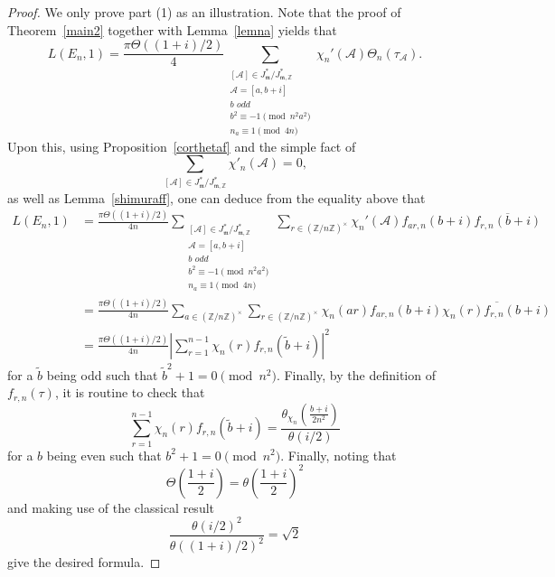 \documentclass[10pt,a4paper]{amsart}
\begin{document}
\begin{proof}
    
We only prove part (1) as an illustration.  Note that the proof of Theorem~\ref{main2} together with Lemma~\ref{lemna} yields that
     $$
   L(E_{n},1)=\frac{\pi\Theta((1+i)/2)}{4}\sum_{\substack{[\mathcal{A}]\in J_{\mathfrak{m}}^{*}/J_{\mathfrak{m},\mathbb{Z}}^{*}\\ \mathcal{A}=[a,b+i]\\b\,\,odd\\b^{2}\equiv-1\pmod{n^{2}a^{2}}\\n_{a}\equiv1\pmod{4n}}}\chi_{n}'(\mathcal{A})\Theta_{n}(\tau_{\mathcal{A}}).
    $$
Upon this,    using Proposition~\ref{corthetaf} and the simple fact of
$$
\sum_{[\mathcal{A}]\in J_{\mathfrak{m}}^{*}/J_{\mathfrak{m},\mathbb{Z}}^{*}}\chi'_{n}(\mathcal{A})=0,
$$
as well as Lemma~\ref{shimuraff},  one can deduce from the equality above that
   \begin{align*}
        L(E_{n},1)&=\frac{\pi\Theta((1+i)/2)}{4n}\sum_{\substack{[\mathcal{A}]\in J_{\mathfrak{m}}^{*}/J_{\mathfrak{m},\mathbb{Z}}^{*}\\ \mathcal{A}=[a,b+i]\\b\,\,odd\\b^{2}\equiv-1\pmod{n^{2}a^{2}}\\n_{a}\equiv1\pmod{4n}}}\sum_{r\in(\mathbb{Z}/n\mathbb{Z})^{\times}}\chi_{n}'(\mathcal{A})f_{ar,n}(b+i)\overline{f_{r,n}(b+i)}\\
         &=\frac{\pi\Theta((1+i)/2)}{4n}\sum_{a\in(\mathbb{Z}/n\mathbb{Z})^{\times}}\sum_{r\in(\mathbb{Z}/n\mathbb{Z})^{\times}}\chi_{n}(ar)f_{ar,n}(b+i)\overline{\chi_{n}(r)f_{r,n}(b+i)}\\
         &=\frac{\pi\Theta((1+i)/2)}{4n}\left|\sum_{r=1}^{n-1}\chi_{n}(r)f_{r,n}(\tilde{b}+i)\right|^{2}
    \end{align*}
    for a $\tilde{b}$ being odd such that $\tilde{b}^{2}+1=0\pmod{n^{2}}$. Finally, by the definition of $f_{r,n}(\tau)$, it is routine to check that
    $$
    \sum_{r=1}^{n-1}\chi_{n}(r)f_{r,n}(\tilde{b}+i)=\frac{\theta_{\chi_{n}}\left(\frac{b+i}{2n^{2}}\right)}{\theta(i/2)}
    $$
    for a $b$ being even such that $b^{2}+1=0\pmod{n^{2}}$. Finally, noting that
    $$
    \Theta\left(\frac{1+i}{2}\right)=\theta\left(\frac{1+i}{2}\right)^{2}
    $$
    and making use of the classical result
    $$
    \frac{\theta(i/2)^{2}}{\theta((1+i)/2)^{2}}=\sqrt{2}
    $$
    give the desired formula.

\end{proof}
\end{document}
